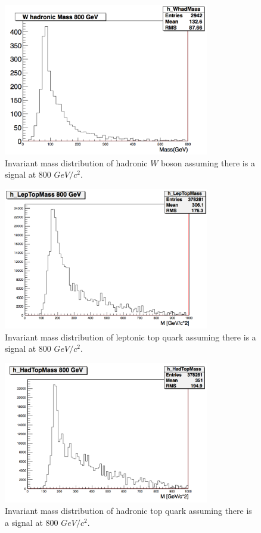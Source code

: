 \documentclass[12pt,oneandhalf,chaparabic,phys,ms,eng]{metu}
\begin{document}
\begin{figure}[!h]
\centering
    \includegraphics[width=0.8\textwidth]{Whad}
    \caption{\label{Whad} Invariant mass distribution of hadronic $W$ boson assuming there is a signal at 800 $GeV/c^2$.}
\end{figure}     

\begin{figure}[!h]
\centering
    \includegraphics[width=0.8\textwidth]{toplep}
    \caption{\label{toplep} Invariant mass distribution of leptonic top quark assuming there is a signal at 800 $GeV/c^2$.}
\end{figure}

\begin{figure}[!h]
\centering
    \includegraphics[width=0.8\textwidth]{tophad}
    \caption{\label{tophad} Invariant mass distribution of hadronic top quark assuming there is a signal at 800 $GeV/c^2$.}
\end{figure}
\end{document}
